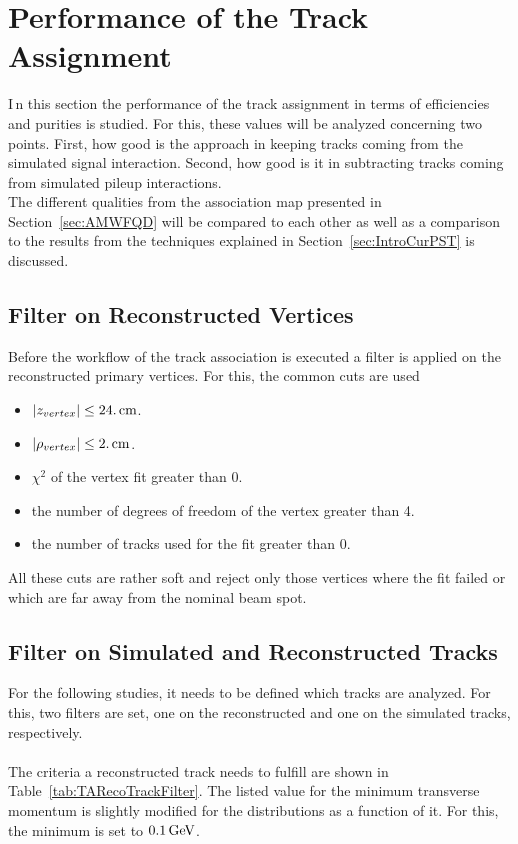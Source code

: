 \chapter{Performance of the Track Assignment \label{sec:TrackAss} }

\lettrine[lines=2]{I}{\,}n this section the performance of the track assignment in terms of efficiencies and purities is studied. For this, these values will be analyzed concerning two points. First, how good is the approach in keeping tracks coming from the simulated signal interaction. Second, how good is it in subtracting tracks coming from simulated pileup interactions.\\
The different qualities from the association map presented in Section~\ref{sec:AMWFQD} will be compared to each other as well as a comparison to the results from the techniques explained in Section~\ref{sec:IntroCurPST} is discussed.

\section{Filter on Reconstructed Vertices \label{sec:TAFVC}}

Before the workflow of the track association is executed a filter is applied on the reconstructed primary vertices. For this, the common cuts are used
\begin{itemize}
\item $ \left| z_{vertex} \right| \leq 24.\,\text{cm}$.
\item $ \left| \rho_{vertex} \right| \leq 2.\,\text{cm}$.
\item $\chi^{2}$ of the vertex fit greater than 0.
\item the number of degrees of freedom of the vertex greater than 4.
\item the number of tracks used for the fit greater than 0.
\end{itemize}
All these cuts are rather soft and reject only those vertices where the fit failed or which are far away from the nominal beam spot. 

\section{Filter on Simulated and Reconstructed Tracks \label{sec:TAFSRT}}

For the following studies, it needs to be defined which tracks are analyzed. For this, two filters are set, one on the reconstructed and one on the simulated tracks, respectively. \\ \\
The criteria a reconstructed track needs to fulfill are shown in Table~\ref{tab:TARecoTrackFilter}. The listed value for the minimum transverse momentum is slightly modified for the distributions as a function of it. For this, the minimum \pt is set to $0.1\,\text{Ge\hspace{-.08em}V}$. \\

